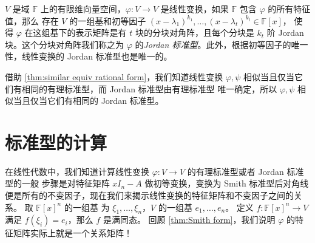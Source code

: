 \documentclass[fontset=none,zihao=-4]{Notes}
\begin{document}
\begin{theorem}
  $V$ 是域 $\mathbb{F}$ 上的有限维向量空间，$\varphi:V\to V$ 是线性变换，如果
  $\mathbb{F}$ 包含 $\varphi$ 的所有特征值，那么
  存在 $V$ 的一组基和初等因子 $(x-\lambda_1)^{k_1},\dots,(x-\lambda_t)^{k_t}\in\mathbb{F}[x]$，
  使得 $\varphi$ 在这组基下的表示矩阵是有 $t$ 块的分块对角阵，且每个分块是
  $k_t$ 阶 Jordan 块。这个分块对角阵我们称之为 $\varphi$
  的\emph{Jordan 标准型}。此外，根据初等因子的唯一性，线性变换的 Jordan 标准型也是唯一的。
\end{theorem}

借助 \autoref{thm:similar equiv rational form}，我们知道线性变换
$\varphi,\psi$ 相似当且仅当它们有相同的有理标准型，而 Jordan 标准型由有理标准型
唯一确定，所以 $\varphi,\psi$ 相似当且仅当它们有相同的 Jordan 标准型。


\section{标准型的计算}

在线性代数中，我们知道计算线性变换 $\varphi:V\to V$ 的有理标准型或者 Jordan 标准型的一般
步骤是对特征矩阵 $xI_n-A$ 做初等变换，变换为 Smith 标准型后对角线
便是所有的不变因子，现在我们来揭示线性变换的特征矩阵和不变因子之间的关系。
取 $\mathbb{F}[x]^n$ 的一组基
为 $\xi_1,\dots,\xi_n$，$V$ 的一组基 $e_1,\dots,e_n$。
定义 $f:\mathbb{F}[x]^n\to V$ 满足 $f(\xi_i)=e_i$，那么 $f$ 是满同态。
回顾 \autoref{thm:Smith form}，我们说明
$\varphi$ 的特征矩阵实际上就是一个关系矩阵！
\end{document}
